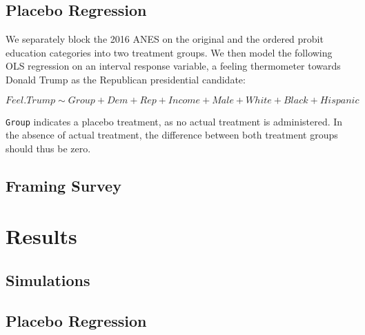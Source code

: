 \documentclass[12pt,econ]{sources/authesis}
\begin{document}
\hypertarget{ordblock-data-plac}{%
\subsection{Placebo Regression}\label{ordblock-data-plac}}

We separately block the 2016 ANES on the original and the ordered probit education categories into two treatment groups. We then model the following OLS regression on an interval response variable, a feeling thermometer towards Donald Trump as the Republican presidential candidate:

\vspace{-1cm}

\[Feel.Trump \sim Group + Dem + Rep + Income + Male + White + Black + Hispanic\]

\texttt{Group} indicates a placebo treatment, as no actual treatment is administered. In the absence of actual treatment, the difference between both treatment groups should thus be zero.

\hypertarget{ordblock-data-framing}{%
\subsection{Framing Survey}\label{ordblock-data-framing}}

\hypertarget{ordblock-results}{%
\section{Results}\label{ordblock-results}}

\hypertarget{ordblock-results-sims}{%
\subsection{Simulations}\label{ordblock-results-sims}}

\hypertarget{ordblock-results-plac}{%
\subsection{Placebo Regression}\label{ordblock-results-plac}}
\end{document}
